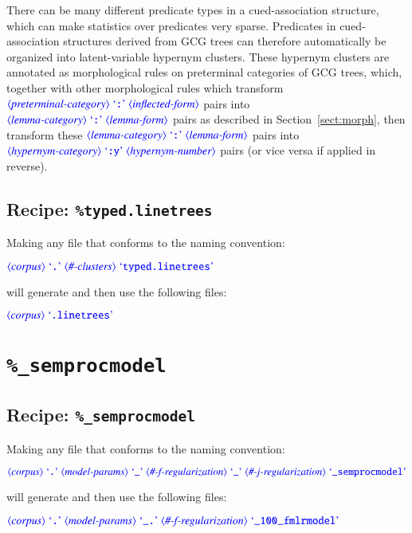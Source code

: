 \documentclass[12pt]{report}
\def\blue{\color{blue}}
\begin{document}
There can be many different predicate types in a cued-association structure, which can make statistics over predicates very sparse.
%
Predicates in cued-association structures derived from \citet{nguyenetal12} GCG trees can therefore automatically be organized into latent-variable hypernym clusters.
%
These hypernym clusters are annotated as morphological rules on preterminal categories of GCG trees, which, together with other morphological rules which transform $\dtype{preterminal-category} \ \dcode{:} \ \dtype{inflected-form}$ pairs into $\dtype{lemma-category} \ \dcode{:} \ \dtype{lemma-form}$ pairs as described in Section~\ref{sect:morph}, then transform these $\dtype{lemma-category} \ \dcode{:} \ \dtype{lemma-form}$ pairs into $\dtype{hypernym-category} \ \dcode{:y} \ \dtype{hypernym-number}$ pairs (or vice versa if applied in reverse).

\subsection{Recipe: {\blue\tt \%typed.linetrees}}

Making any file that conforms to the naming convention:

$\dtype{corpus} \ \dcode{.} \ \dtype{\#-clusters} \ \dcode{typed.linetrees}$

will generate and then use the following files:

$\dtype{corpus} \ \dcode{.linetrees}$


\section{{\blue\tt \%\_semprocmodel}}

\subsection{Recipe: {\blue\tt \%\_semprocmodel}}

Making any file that conforms to the naming convention:

$\dtype{corpus} \ \dcode{.} \ \dtype{model-params} \ \dcode{\_} \ \dtype{\#-f-regularization} \ \dcode{\_} \ \dtype{\#-j-regularization} \ \dcode{\_semprocmodel}$

will generate and then use the following files:

$\dtype{corpus} \ \dcode{.} \ \dtype{model-params} \ \dcode{\_.} \ \dtype{\#-f-regularization} \ \dcode{\_100\_fmlrmodel}$
\end{document}
